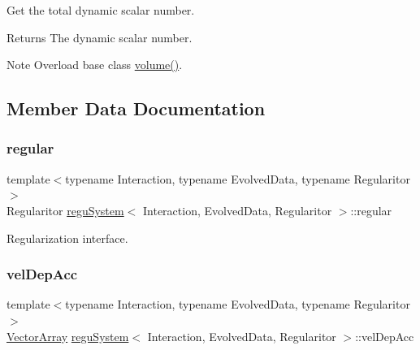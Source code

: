 Get the total dynamic scalar number. 

\begin{DoxyReturn}{Returns}
The dynamic scalar number. 
\end{DoxyReturn}
\begin{DoxyNote}{Note}
Overload base class \mbox{\hyperlink{classregu_system_a4260b237d36d137b01504c0effd385fa}{volume()}}. 
\end{DoxyNote}


\subsection{Member Data Documentation}
\mbox{\label{classregu_system_a0009f79e1dbc7668e2cac4bc90332353}} 
\subsubsection{\texorpdfstring{regular}{regular}}
{\footnotesize\ttfamily template$<$typename Interaction, typename Evolved\+Data, typename Regularitor$>$ \\
Regularitor \mbox{\hyperlink{classregu_system}{regu\+System}}$<$ Interaction, Evolved\+Data, Regularitor $>$\+::regular\hspace{0.3cm}{\ttfamily [private]}}



Regularization interface. 

\mbox{\label{classregu_system_a3ea004b24ff22b8cc2f79f48e96dfad3}} 
\subsubsection{\texorpdfstring{vel\+Dep\+Acc}{velDepAcc}}
{\footnotesize\ttfamily template$<$typename Interaction, typename Evolved\+Data, typename Regularitor$>$ \\
\mbox{\hyperlink{classregu_system_aa4ecefb5c437230b994171e231450be8}{Vector\+Array}} \mbox{\hyperlink{classregu_system}{regu\+System}}$<$ Interaction, Evolved\+Data, Regularitor $>$\+::vel\+Dep\+Acc\hspace{0.3cm}{\ttfamily [private]}}



